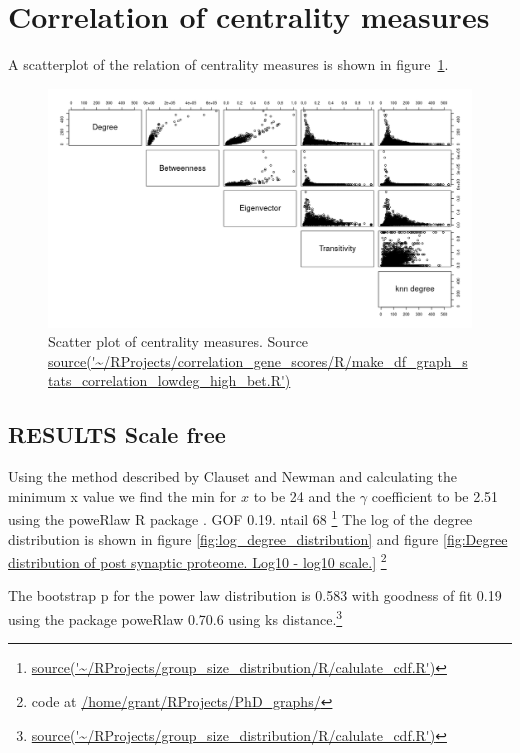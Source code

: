 \section{Correlation of centrality measures}

A scatterplot of the relation of centrality measures is shown in figure~\ref{fig:scatter plot of multiple centrality measures}.

\begin{figure} 
    \centering
    \includegraphics[width=\textwidth]{images/Rplot_pairs_plot.png}
    \caption{Scatter plot of centrality measures. Source \url{source('~/RProjects/correlation_gene_scores/R/make_df_graph_stats_correlation_lowdeg_high_bet.R')}}
    \label{fig:scatter plot of multiple centrality measures}
\end{figure}
\subsection{RESULTS Scale free}
Using the method described by Clauset and Newman \cite{clauset2009power} and calculating the minimum x value we find the min for $x$ to be 24 and the $\gamma$ coefficient to be 2.51 using the poweRlaw R package \cite{gillespie2015fitting}. GOF 0.19. ntail 68 \footnote{\url{source('~/RProjects/group_size_distribution/R/calulate_cdf.R')}} The log of the degree distribution is shown in figure \ref{fig:log_degree_distribution} and figure \ref{fig:Degree distribution of post synaptic proteome. Log10 - log10 scale.}
\footnote{code at \url{/home/grant/RProjects/PhD_graphs/}}


The bootstrap p for the power law distribution is 0.583 with goodness of fit 0.19 using the package poweRlaw 0.70.6 using ks distance.\footnote{\url{source('~/RProjects/group_size_distribution/R/calulate_cdf.R')}}

